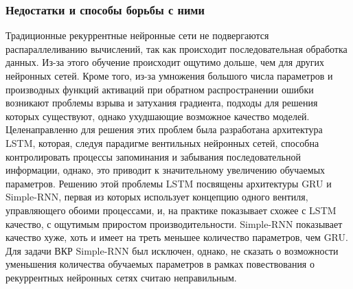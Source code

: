 \subsubsection{Недостатки и способы борьбы с ними}
Традиционные рекуррентные нейронные сети не подвергаются распараллеливанию вычислений, 
так как происходит последовательная обработка данных. Из-за этого обучение происходит 
ощутимо дольше, чем для других нейронных сетей. Кроме того, из-за умножения большого числа параметров и производных функций активаций при обратном распространении ошибки возникают проблемы взрыва и затухания градиента, подходы для решения которых существуют, однако ухудшающие возможное качество моделей. Целенаправленно для решения этих проблем была разработана архитектура LSTM, которая, следуя парадигме вентильных нейронных сетей, способна контролировать процессы запоминания и забывания последовательной информации, однако, это приводит к значительному увеличению обучаемых параметров. Решению этой проблемы LSTM посвящены архитектуры GRU и Simple-RNN, первая из которых использует концепцию одного вентиля, управляющего обоими процессами, и, на практике показывает схожее с LSTM качество, с ощутимым приростом производительности. Simple-RNN показывает качество хуже, хоть и имеет на треть меньшее количество параметров, чем GRU. Для задачи ВКР Simple-RNN был исключен, однако, не сказать о возможности уменьшения количества обучаемых параметров в рамках повествования о рекуррентных нейронных сетях считаю неправильным.%
